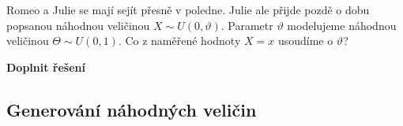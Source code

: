 \documentclass[../main.tex]{subfiles}
\begin{document}
\begin{example}
    Romeo a Julie se mají sejít přesně v poledne. Julie ale přijde pozdě o dobu popsanou náhodnou veličinou $X \sim U(0, \vartheta)$.
    Parametr $\vartheta$ modelujeme náhodnou veličinou $\Theta \sim U(0,1)$. Co z naměřené hodnoty $X = x$ usoudíme o $\vartheta$?
    
    \textbf{Doplnit řešení}
\end{example}
\subsection{Generování náhodných veličin}
\end{document}
